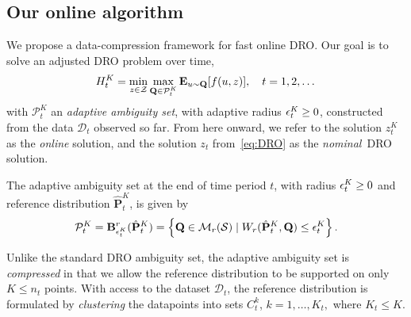 
\subsection{Our online algorithm}
\label{subsec:ours}
We propose a data-compression framework for fast online \gls{DRO}. 
Our goal is to solve an adjusted \gls{DRO} problem over time, 
\begin{equation}\label{eq:dro:time}
H^K_t = \min_{z \in \mathcal{Z}} \max_{\mathbf{Q} \in \mathcal{P}^K_{t}}\mathbf{E}_{u \sim \mathbf{Q}}[f(u,z)],\quad t=1,2,\dots
\end{equation}
with $\mathcal{P}^K_{t}$ an {\it adaptive ambiguity set}, with adaptive radius $\epsilon^K_{t} \geq 0$, constructed from the data $\mathcal{D}_{t}$ observed so far. 
From here onward, we refer to the solution $z^K_t$ as the {\it online} solution, and the solution $z_t$ from~\eqref{eq:DRO} as the {\it nominal}~\gls{DRO} solution.
\begin{definition}
The adaptive ambiguity set at the end of time period $t$, with radius $\epsilon^K_{t}\geq0$ and reference distribution $\hat{\mathbf{P}}^K_{t}$, is given by
\begin{equation}\label{empirical:ball_t}
\mathcal{P}^K_t = \mathbf{B}_{\epsilon^K_{t}}^r(\hat{\mathbf{P}}^K_{t})=\left\{\mathbf{Q} \in \mathcal{M}_r({\mathcal{S}}) \mid W_r(\hat{\mathbf{P}}^K_{t}, \mathbf{Q}) \leq \epsilon^K_{t}\right\}.
\end{equation}
\end{definition}
Unlike the standard \gls{DRO} ambiguity set, the adaptive ambiguity set is {\it compressed} in that we allow the reference distribution to be supported on only $K \leq n_t$ points.
With access to the dataset $\mathcal{D}_t$, the reference distribution is formulated by {\it clustering} the datapoints into sets $C^k_t$, $k = 1, \dots,K_t,$ where $K_t \leq K$.
